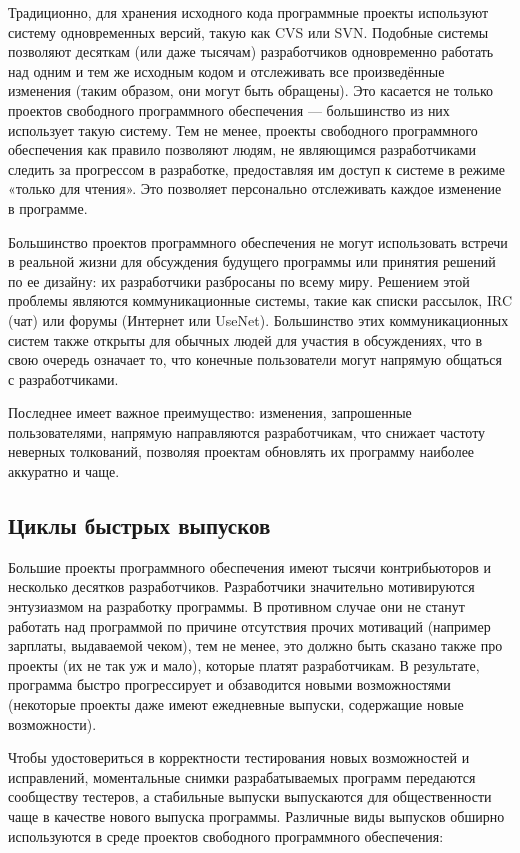 \documentclass[12pt]{book}
\begin{document}
Традиционно, для хранения исходного кода программные проекты используют систему одновременных версий, такую как CVS или SVN. Подобные системы позволяют десяткам (или  даже тысячам) разработчиков одновременно работать над одним и тем же исходным кодом  и отслеживать все произведённые изменения (таким образом, они могут быть обращены). Это касается не только проектов свободного программного обеспечения — большинство из них использует такую систему. Тем не менее, проекты свободного программного обеспечения как правило позволяют людям, не являющимся разработчиками следить за прогрессом в разработке, предоставляя им доступ к системе в режиме «только для чтения». Это позволяет персонально отслеживать каждое изменение в программе. 

Большинство проектов программного обеспечения не могут использовать встречи в реальной жизни для обсуждения будущего программы или принятия решений по ее дизайну: их разработчики разбросаны по всему миру. Решением этой проблемы являются коммуникационные системы, такие как списки рассылок, IRC (чат) или форумы (Интернет или UseNet).  Большинство этих коммуникационных систем также открыты для обычных людей для участия в обсуждениях, что в свою очередь означает то, что конечные пользователи могут напрямую общаться с разработчиками. 

Последнее имеет важное преимущество: изменения, запрошенные пользователями, напрямую направляются разработчикам, что снижает частоту неверных толкований, позволяя проектам обновлять их программу наиболее аккуратно и чаще. 

\subsection{Циклы быстрых выпусков}

Большие проекты программного обеспечения имеют тысячи контрибьюторов и несколько десятков разработчиков. Разработчики значительно мотивируются энтузиазмом на разработку программы. В противном случае они не станут работать над программой по причине отсутствия прочих мотиваций (например  зарплаты, выдаваемой чеком), тем не менее, это должно быть сказано также про проекты (их не так уж и мало), которые платят разработчикам. В результате, программа быстро прогрессирует и обзаводится новыми возможностями (некоторые проекты даже имеют ежедневные выпуски, содержащие новые возможности). 

Чтобы удостовериться в корректности тестирования новых возможностей и исправлений, моментальные снимки разрабатываемых программ передаются сообществу тестеров, а стабильные выпуски выпускаются для общественности чаще в качестве нового выпуска программы. Различные виды выпусков обширно используются в среде проектов свободного программного обеспечения:
\end{document}
